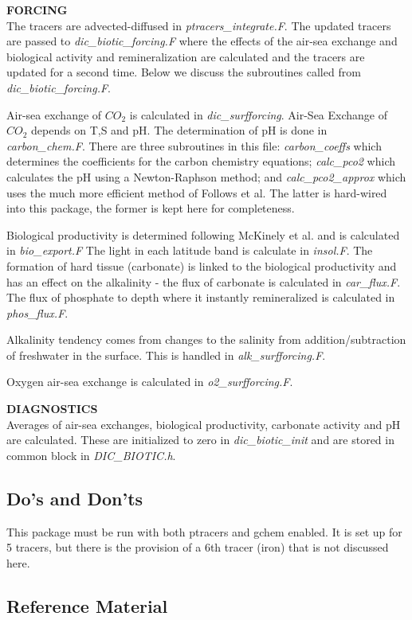 \vspace{.5cm}

\noindent
{{\bf FORCING}}\\
The tracers are advected-diffused in {\it ptracers\_integrate.F}.
The updated tracers are passed to {\it dic\_biotic\_forcing.F}
where the effects of the air-sea exchange and biological
activity and remineralization are calculated and the tracers
are updated for a second time. Below we discuss the 
subroutines called from {\it dic\_biotic\_forcing.F}.


Air-sea exchange of $CO_2$ is calculated in {\it dic\_surfforcing}.
Air-Sea Exchange of $CO_2$ depends on T,S and pH. The determination
of pH is done in {\it carbon\_chem.F}. There are three subroutines
in this file: {\it carbon\_coeffs} which determines the coefficients
for the carbon chemistry equations; {\it calc\_pco2} which calculates
the pH using a Newton-Raphson method; and {\it calc\_pco2\_approx}
which uses the much more efficient method of Follows et al.
The latter is hard-wired into this package, the former is kept
here for completeness.

Biological productivity is determined following
McKinely et al. and is calculated in {\it bio\_export.F}
The light in each latitude band is calculate in {\it insol.F}.
The formation of hard tissue (carbonate) is linked to
the biological productivity and has an effect on the
alkalinity - the flux of carbonate is calculated in
{\it car\_flux.F}. The flux of phosphate to depth where
it instantly remineralized is calculated in {\it phos\_flux.F}.

Alkalinity tendency comes from changes to the salinity from
addition/subtraction of freshwater in the surface. This
is handled in {\it alk\_surfforcing.F}.

Oxygen air-sea exchange is calculated in {\it o2\_surfforcing.F}.
 
\vspace{.5cm}

\noindent
{{\bf DIAGNOSTICS}}\\
Averages of air-sea exchanges, biological productivity,
carbonate activity and pH are calculated. These are
initialized to zero in {\it dic\_biotic\_init} and
are stored in common block in {\it DIC\_BIOTIC.h}.

\subsection{Do's and Don'ts}

This package must be run with both ptracers and gchem enabled.
It is set up for 5 tracers, but there is the provision of
a 6th tracer (iron) that is not discussed here.

\subsection{Reference Material}

